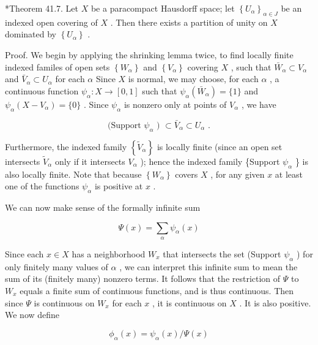 \documentclass[10pt]{article}
\begin{document}
*Theorem 41.7. Let \(X\) be a paracompact Hausdorff space; let \({\left\{  {U}_{\alpha }\right\}  }_{\alpha  \in  J}\) be an indexed open covering of \(X\) . Then there exists a partition of unity on \(X\) dominated by \(\left\{  {U}_{\alpha }\right\}\) .

Proof. We begin by applying the shrinking lemma twice, to find locally finite indexed familes of open sets \(\left\{  {W}_{\alpha }\right\}\) and \(\left\{  {V}_{\alpha }\right\}\) covering \(X\) , such that \({\bar{W}}_{\alpha } \subset  {V}_{\alpha }\) and \({\bar{V}}_{\alpha } \subset  {U}_{\alpha }\) for each \(\alpha\) Since \(X\) is normal, we may choose, for each \(\alpha\) , a continuous function \({\psi }_{\alpha } : X \rightarrow  \left\lbrack  {0,1}\right\rbrack\) such that \({\psi }_{\alpha }\left( {\bar{W}}_{\alpha }\right)  = \{ 1\}\) and \({\psi }_{\alpha }\left( {X - {V}_{\alpha }}\right)  = \{ 0\}\) . Since \({\psi }_{\alpha }\) is nonzero only at points of \({V}_{\alpha }\) , we have

\[
\text{ (Support }{\psi }_{\alpha }\text{ ) } \subset  {\bar{V}}_{\alpha } \subset  {U}_{\alpha }\text{ . }
\]

Furthermore, the indexed family \(\left\{  {\widetilde{V}}_{\alpha }\right\}\) is locally finite (since an open set intersects \({\widetilde{V}}_{\alpha }\) only if it intersects \({V}_{\alpha }\) ); hence the indexed family \{Support \({\psi }_{\alpha }\) \} is also locally finite. Note that because \(\left\{  {W}_{\alpha }\right\}\) covers \(X\) , for any given \(x\) at least one of the functions \({\psi }_{\alpha }\) is positive at \(x\) .

We can now make sense of the formally infinite sum

\[
\Psi \left( x\right)  = \mathop{\sum }\limits_{\alpha }{\psi }_{\alpha }\left( x\right)
\]

Since each \(x \in  X\) has a neighborhood \({W}_{x}\) that intersects the set (Support \({\psi }_{\alpha }\) ) for only finitely many values of \(\alpha\) , we can interpret this infinite sum to mean the sum of its (finitely many) nonzero terms. It follows that the restriction of \(\Psi\) to \({W}_{x}\) equals a finite sum of continuous functions, and is thus continuous. Then since \(\Psi\) is continuous on \({W}_{x}\) for each \(x\) , it is continuous on \(X\) . It is also positive. We now define

\[
{\phi }_{\alpha }\left( x\right)  = {\psi }_{\alpha }\left( x\right) /\Psi \left( x\right)
\]
\end{document}
